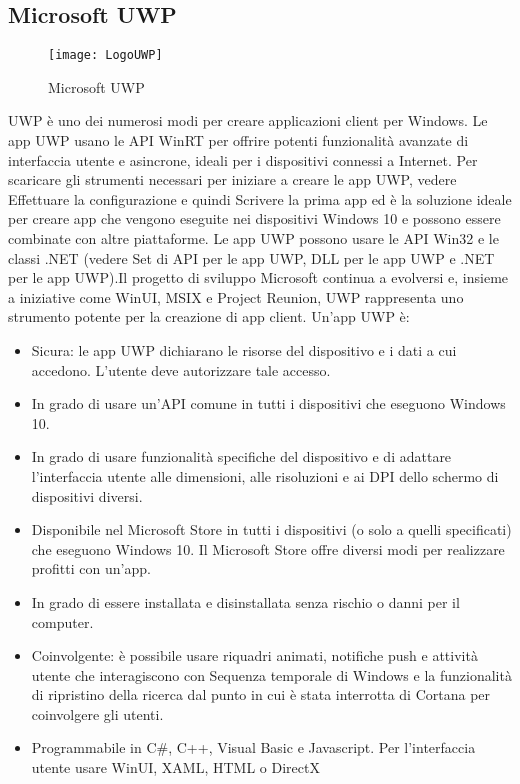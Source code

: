 \subsection{Microsoft UWP}
\begin{figure}[htpb!]
\center
  \texttt{[image: LogoUWP]}
  \caption{Microsoft UWP}
\end{figure}
UWP\cite{uwpdoc} è uno dei numerosi modi per creare applicazioni client per Windows. Le app UWP usano le API WinRT per offrire potenti funzionalità avanzate di interfaccia utente e asincrone, ideali per i dispositivi connessi a Internet.
Per scaricare gli strumenti necessari per iniziare a creare le app UWP, vedere Effettuare la configurazione e quindi Scrivere la prima app ed è la soluzione ideale per creare app che vengono eseguite nei dispositivi Windows 10 e possono essere combinate con altre piattaforme. Le app UWP possono usare le API Win32 e le classi .NET (vedere Set di API per le app UWP, DLL per le app UWP e .NET per le app UWP).Il progetto di sviluppo Microsoft continua a evolversi e, insieme a iniziative come WinUI, MSIX e Project Reunion, UWP rappresenta uno strumento potente per la creazione di app client.
Un'app UWP è:
\begin{itemize}
\item Sicura: le app UWP dichiarano le risorse del dispositivo e i dati a cui accedono. L'utente deve autorizzare tale accesso.
\item In grado di usare un'API comune in tutti i dispositivi che eseguono Windows 10.
\item In grado di usare funzionalità specifiche del dispositivo e di adattare l'interfaccia utente alle dimensioni, alle risoluzioni e ai DPI dello schermo di dispositivi diversi.
\item Disponibile nel Microsoft Store in tutti i dispositivi (o solo a quelli specificati) che eseguono Windows 10. Il Microsoft Store offre diversi modi per realizzare profitti con un'app.
\item In grado di essere installata e disinstallata senza rischio o danni per il computer.
\item Coinvolgente: è possibile usare riquadri animati, notifiche push e attività utente che interagiscono con Sequenza temporale di Windows e la funzionalità di ripristino della ricerca dal punto in cui è stata interrotta di Cortana per coinvolgere gli utenti.
\item Programmabile in C\#, C++, Visual Basic e Javascript. Per l'interfaccia utente usare WinUI, XAML, HTML o DirectX
\end{itemize}
